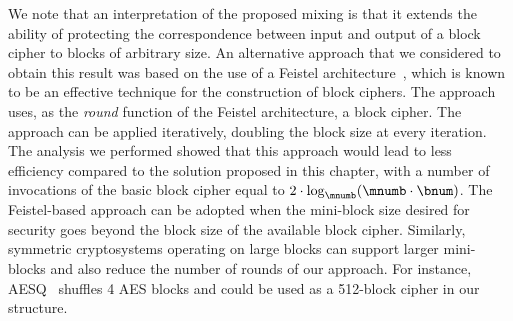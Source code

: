 We note that an interpretation of the proposed mixing is that it extends the ability of protecting the correspondence between input and output of a block cipher to blocks of arbitrary size. An alternative approach that we considered to obtain this result was based on the use of a Feistel architecture~\cite{lr88}, which is known to be an effective technique for the construction of block ciphers. The approach uses, as the {\em round} function of the Feistel architecture, a block cipher. The approach can be applied iteratively, doubling the block size at every iteration. The analysis we performed showed that this approach would lead to less efficiency compared to the solution proposed in this chapter, with a number of invocations of the basic block cipher equal to $2\cdot \log_{\mnumb} (\mnumb \cdot \bnum)$. The Feistel-based approach can be adopted when the mini-block size desired for security goes beyond the block size of the available block cipher. Similarly, symmetric cryptosystems operating on large blocks can support larger mini-blocks and also reduce the number of rounds of our approach. For instance, AESQ~\cite{paeq,paeq2} shuffles 4 AES blocks and could be used as a 512-block cipher in our structure.

